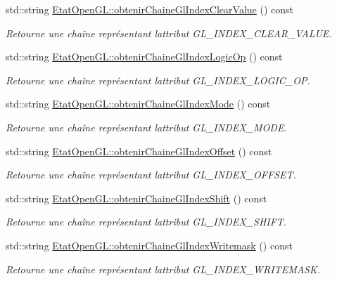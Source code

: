 \begin{DoxyCompactItemize}
std\+::string \hyperlink{group__utilitaire_gad0d02a72c93d1501432001b500bf6435}{Etat\+Open\+G\+L\+::obtenir\+Chaine\+Gl\+Index\+Clear\+Value} () const 
\begin{DoxyCompactList}\small\item\em Retourne une chaîne représentant l\textquotesingle{}attribut G\+L\+\_\+\+I\+N\+D\+E\+X\+\_\+\+C\+L\+E\+A\+R\+\_\+\+V\+A\+L\+U\+E. \end{DoxyCompactList}\item 
std\+::string \hyperlink{group__utilitaire_ga5294ee67327c1a604fe1ac627d539acc}{Etat\+Open\+G\+L\+::obtenir\+Chaine\+Gl\+Index\+Logic\+Op} () const 
\begin{DoxyCompactList}\small\item\em Retourne une chaîne représentant l\textquotesingle{}attribut G\+L\+\_\+\+I\+N\+D\+E\+X\+\_\+\+L\+O\+G\+I\+C\+\_\+\+O\+P. \end{DoxyCompactList}\item 
std\+::string \hyperlink{group__utilitaire_ga5413d656a860db0103e85dcd025970e8}{Etat\+Open\+G\+L\+::obtenir\+Chaine\+Gl\+Index\+Mode} () const 
\begin{DoxyCompactList}\small\item\em Retourne une chaîne représentant l\textquotesingle{}attribut G\+L\+\_\+\+I\+N\+D\+E\+X\+\_\+\+M\+O\+D\+E. \end{DoxyCompactList}\item 
std\+::string \hyperlink{group__utilitaire_ga2ef77a1752dfc7df305e66d9ebc8fee0}{Etat\+Open\+G\+L\+::obtenir\+Chaine\+Gl\+Index\+Offset} () const 
\begin{DoxyCompactList}\small\item\em Retourne une chaîne représentant l\textquotesingle{}attribut G\+L\+\_\+\+I\+N\+D\+E\+X\+\_\+\+O\+F\+F\+S\+E\+T. \end{DoxyCompactList}\item 
std\+::string \hyperlink{group__utilitaire_gabb665544045af095c7c301467b71a53d}{Etat\+Open\+G\+L\+::obtenir\+Chaine\+Gl\+Index\+Shift} () const 
\begin{DoxyCompactList}\small\item\em Retourne une chaîne représentant l\textquotesingle{}attribut G\+L\+\_\+\+I\+N\+D\+E\+X\+\_\+\+S\+H\+I\+F\+T. \end{DoxyCompactList}\item 
std\+::string \hyperlink{group__utilitaire_ga7041e09cfd847b59e2fd8b306639b2e2}{Etat\+Open\+G\+L\+::obtenir\+Chaine\+Gl\+Index\+Writemask} () const 
\begin{DoxyCompactList}\small\item\em Retourne une chaîne représentant l\textquotesingle{}attribut G\+L\+\_\+\+I\+N\+D\+E\+X\+\_\+\+W\+R\+I\+T\+E\+M\+A\+S\+K. \end{DoxyCompactList}\item 

\end{DoxyCompactItemize}
